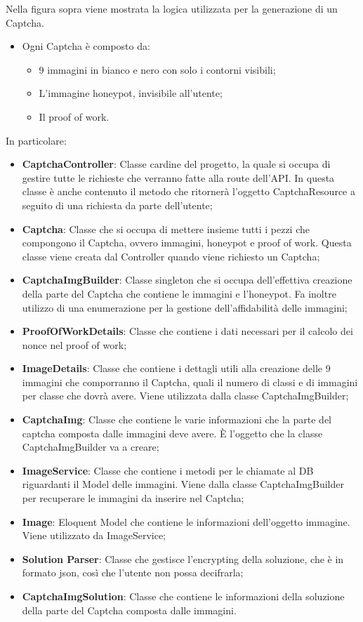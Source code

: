 Nella figura sopra viene mostrata la logica utilizzata per la generazione di un  Captcha.
\begin{itemize}
    \item  Ogni Captcha è composto da:
    \begin{itemize}
        \item 9 immagini in bianco e nero con solo i contorni visibili;
        \item L'immagine honeypot, invisibile all'utente;
        \item Il proof of work.
    \end{itemize}
\end{itemize}

In particolare:
\begin{itemize}
    \item \textbf{CaptchaController}: Classe cardine del progetto, la quale si occupa di gestire tutte le richieste che verranno fatte alla route dell'API. In questa classe è anche contenuto il metodo che ritornerà l'oggetto CaptchaResource a seguito di una richiesta da parte dell'utente;
    \item \textbf{Captcha}: Classe che si occupa di mettere insieme tutti i pezzi che compongono il Captcha, ovvero immagini, honeypot e proof of work. Questa classe viene creata dal Controller quando viene richiesto un Captcha;
    \item \textbf{CaptchaImgBuilder}: Classe singleton che si occupa dell'effettiva creazione della parte del Captcha che contiene le immagini e l'honeypot. Fa inoltre utilizzo di una enumerazione per la gestione dell'affidabilità delle immagini;
    \item \textbf{ProofOfWorkDetails}: Classe che contiene i dati necessari per il calcolo dei nonce nel proof of work;
    \item \textbf{ImageDetails}: Classe che contiene i dettagli utili alla creazione delle 9 immagini che comporranno il Captcha, quali il numero di classi e di immagini per classe che dovrà avere. Viene utilizzata dalla classe CaptchaImgBuilder;
    \item \textbf{CaptchaImg}: Classe che contiene le varie informazioni che la parte del captcha composta dalle immagini deve avere. È l'oggetto che la classe CaptchaImgBuilder va a creare;
    \item \textbf{ImageService}: Classe che contiene i metodi per le chiamate al DB riguardanti il Model delle immagini. Viene dalla classe CaptchaImgBuilder per recuperare le immagini da inserire nel Captcha;
    \item \textbf{Image}: Eloquent Model che contiene le informazioni dell'oggetto immagine. Viene utilizzato da ImageService;
    \item \textbf{Solution Parser}: Classe che gestisce l'encrypting della soluzione, che è in formato json, così che l'utente non possa decifrarla;
    \item \textbf{CaptchaImgSolution}: Classe che contiene le informazioni della soluzione della parte del Captcha composta dalle immagini.
\end{itemize}

